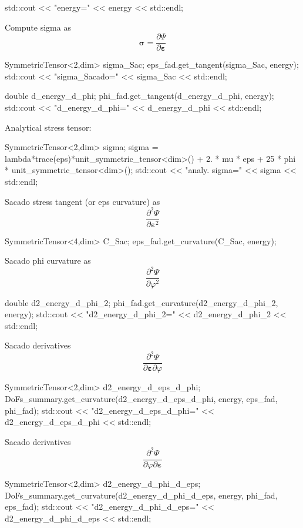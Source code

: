 \begin{DoxyCode}
std::cout << \textcolor{stringliteral}{"energy="} << energy << std::endl;
\end{DoxyCode}
 Compute sigma as \[ \boldsymbol{\sigma} = \frac{\partial \Psi}{\partial \boldsymbol{\varepsilon}} \] 
\begin{DoxyCode}
SymmetricTensor<2,dim> sigma\_Sac;
eps\_fad.get\_tangent(sigma\_Sac, energy);
std::cout << \textcolor{stringliteral}{"sigma\_Sacado="} << sigma\_Sac << std::endl;

\textcolor{keywordtype}{double} d\_energy\_d\_phi;
phi\_fad.get\_tangent(d\_energy\_d\_phi, energy);
std::cout << \textcolor{stringliteral}{"d\_energy\_d\_phi="} << d\_energy\_d\_phi << std::endl;
\end{DoxyCode}
 Analytical stress tensor\+: 
\begin{DoxyCode}
SymmetricTensor<2,dim> sigma;
sigma = lambda*trace(eps)*unit\_symmetric\_tensor<dim>() + 2. * mu * eps + 25 * phi * 
      unit\_symmetric\_tensor<dim>();
std::cout << \textcolor{stringliteral}{"analy. sigma="} << sigma << std::endl;
\end{DoxyCode}
 Sacado stress tangent (or eps curvature) as \[ \frac{\partial^2 \Psi}{\partial \boldsymbol{\varepsilon}^2} \] 
\begin{DoxyCode}
SymmetricTensor<4,dim> C\_Sac;
eps\_fad.get\_curvature(C\_Sac, energy);
\end{DoxyCode}
 Sacado phi curvature as \[ \frac{\partial^2 \Psi}{\partial \varphi^2} \] 
\begin{DoxyCode}
\textcolor{keywordtype}{double} d2\_energy\_d\_phi\_2;
phi\_fad.get\_curvature(d2\_energy\_d\_phi\_2, energy);
std::cout << \textcolor{stringliteral}{"d2\_energy\_d\_phi\_2="} << d2\_energy\_d\_phi\_2 << std::endl;
\end{DoxyCode}
 Sacado derivatives \[ \frac{\partial^2 \Psi}{\partial \boldsymbol{\varepsilon} \partial \varphi} \] 
\begin{DoxyCode}
SymmetricTensor<2,dim> d2\_energy\_d\_eps\_d\_phi;
DoFs\_summary.get\_curvature(d2\_energy\_d\_eps\_d\_phi, energy, eps\_fad, phi\_fad);
std::cout << \textcolor{stringliteral}{"d2\_energy\_d\_eps\_d\_phi="} << d2\_energy\_d\_eps\_d\_phi << std::endl;
\end{DoxyCode}
 Sacado derivatives \[ \frac{\partial^2 \Psi}{\partial \varphi \partial \boldsymbol{\varepsilon}} \] 
\begin{DoxyCode}
SymmetricTensor<2,dim> d2\_energy\_d\_phi\_d\_eps;
DoFs\_summary.get\_curvature(d2\_energy\_d\_phi\_d\_eps, energy, phi\_fad, eps\_fad);
std::cout << \textcolor{stringliteral}{"d2\_energy\_d\_phi\_d\_eps="} << d2\_energy\_d\_phi\_d\_eps << std::endl;
\end{DoxyCode}
